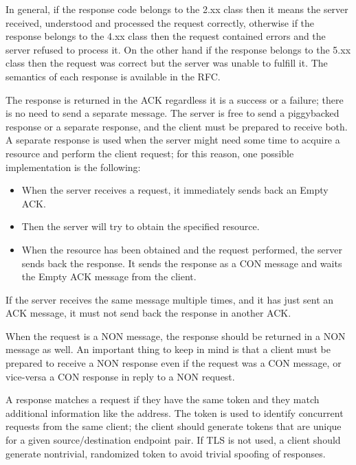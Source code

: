 	
	
	In general, if the response code belongs to the 2.xx class then it means the server received, understood and processed the request correctly, otherwise if the response belongs to the 4.xx class then the request contained errors and the server refused to process it. On the other hand if the response belongs to the 5.xx class then the request was correct but the server was unable to fulfill it.\newline
	The semantics of each response is available in the RFC.\newline
	
	The response is returned in the ACK regardless it is a success or a failure; there is no need to send a separate message.\newline
	The server is free to send a piggybacked response or a separate response, and the client must be prepared to receive both.\newline
	A separate response is used when the server might need some time to acquire a resource and perform the client request; for this reason, one possible implementation is the following:
	\begin{itemize}
		\item When the server receives a request, it immediately sends back an Empty ACK.
		\item Then the server will try to obtain the specified resource.
		\item When the resource has been obtained and the request performed, the server sends back the response.
		It sends the response as a CON message and waits the Empty ACK message from the client.
	\end{itemize}
	If the server receives the same message multiple times, and it has just sent an ACK message, it must not send back the response in another ACK.\newline
	
	When the request is a NON message, the response should be returned in a NON message as well.\newline
	An important thing to keep in mind is that a client must be prepared to receive a NON response even if the request was a CON message, or vice-versa a CON response in reply to a NON request.\newline
	
	A response matches a request if they have the same token and they match additional information like the address.\newline
	The token is used to identify concurrent requests from the same client; the client should generate tokens that are unique for a given source/destination endpoint pair.\newline
	If TLS is not used, a client should generate nontrivial, randomized token to avoid trivial spoofing of responses.\newline
	

